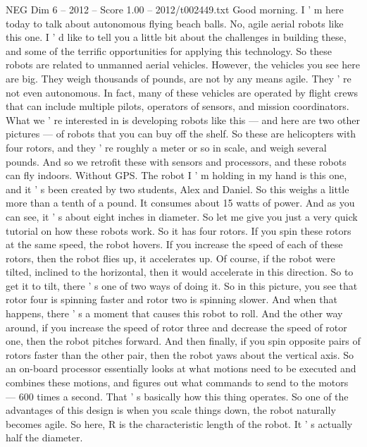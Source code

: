 \begin{textsample}{NEG Dim 6 – 2012 – Score 1.00 – 2012/t002449.txt}  \label{ex:f6_neg_037}
Good morning.
I ' m here today to talk about autonomous flying beach balls.
No, agile aerial robots like this one.
I ' d like to tell you a little bit about the challenges in building these, and some of the terrific opportunities for applying this technology.
So these robots are related to unmanned aerial vehicles.
However, the vehicles you see here are big.
They weigh thousands of pounds, are not by any means agile.
They ' re not even autonomous.
In fact, many of these vehicles are operated by flight crews that can include multiple pilots, operators of sensors, and mission coordinators.
What we ' re interested in is developing robots like this — and here are two other pictures — of robots that you can buy off the shelf.
So these are helicopters with four rotors, and they ' re roughly a meter or so in scale, and weigh several pounds.
And so we retrofit these with sensors and processors, and these robots can fly indoors.
Without GPS.
The robot I ' m holding in my hand is this one, and it ' s been created by two students, Alex and Daniel.
So this weighs a little more than a tenth of a pound.
It consumes about 15 watts of power.
And as you can see, it ' s about eight inches in diameter.
So let me give you just a very quick tutorial on how these robots work.
So it has four rotors.
If you spin these rotors at the same speed, the robot hovers.
If you increase the speed of each of these rotors, then the robot flies up, it accelerates up.
Of course, if the robot were tilted, inclined to the horizontal, then it would accelerate in this direction.
So to get it to tilt, there ' s one of two ways of doing it.
So in this picture, you see that rotor four is spinning faster and rotor two is spinning slower.
And when that happens, there ' s a moment that causes this robot to roll.
And the other way around, if you increase the speed of rotor three and decrease the speed of rotor one, then the robot pitches forward.
And then finally, if you spin opposite pairs of rotors faster than the other pair, then the robot yaws about the vertical axis.
So an on-board processor essentially looks at what motions need to be executed and combines these motions, and figures out what commands to send to the motors — 600 times a second.
That ' s basically how this thing operates.
So one of the advantages of this design is when you scale things down, the robot naturally becomes agile.
So here, R is the characteristic length of the robot.
It ' s actually half the diameter.

\end{textsample}
